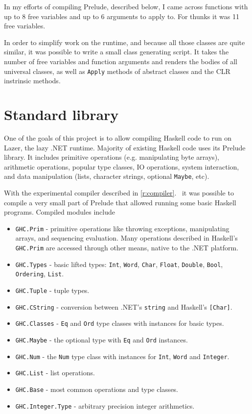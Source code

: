 \documentclass[en]{pracamgr}
\newcommand{\myref}[1]{\ref{#1}.~\textit{\nameref{#1}}}
\begin{document}
In my efforts of compiling Prelude, described below, I came across
functions with up to 8 free variables and up to 6 arguments to apply to.
For thunks it was 11 free variables.

In order to simplify work on the runtime, and because all those classes
are quite similar, it was possible to write a small class generating script.
It takes the number of free variables and function arguments and renders
the bodies of all universal classes, as well as \texttt{Apply} methods
of abstract classes and the CLR instrinsic methods.

\section{Standard library}

One of the goals of this project is to allow compiling
Haskell code to run on Lazer, the lazy .NET runtime.
Majority of existing Haskell code uses its Prelude library.
It includes primitive operations (e.g. manipulating byte arrays),
arithmetic operations, popular type classes,
IO operations, system interaction, and data manipulation
(lists, character strings, optional \texttt{Maybe}, etc).

With the experimental compiler described in \myref{r:compiler}
it was possible to compile a very small part of Prelude that allowed
running some basic Haskell programs. Compiled modules include

\begin{itemize}
    \item \texttt{GHC.Prim} - primitive operations like throwing exceptions,
            manipulating arrays, and sequencing evaluation. Many
            operations described in Haskell's \texttt{GHC.Prim} are accessed
            through other means, native to the .NET platform.
    \item \texttt{GHC.Types} - basic lifted types: \texttt{Int}, \texttt{Word},
            \texttt{Char}, \texttt{Float}, \texttt{Double}, \texttt{Bool},
            \texttt{Ordering}, \texttt{List}.
    \item \texttt{GHC.Tuple} - tuple types.
    \item \texttt{GHC.CString} - conversion between .NET's \texttt{string} and
            Haskell's \texttt{[Char]}.
    \item \texttt{GHC.Classes} - \texttt{Eq} and \texttt{Ord} type classes with
            instances for basic types.
    \item \texttt{GHC.Maybe} - the optional type with \texttt{Eq} and \texttt{Ord} instances.
    \item \texttt{GHC.Num} - the \texttt{Num} type class with instances for \texttt{Int},
            \texttt{Word} and \texttt{Integer}.
    \item \texttt{GHC.List} - list operations.
    \item \texttt{GHC.Base} - most common operations and type classes.
    \item \texttt{GHC.Integer.Type} - arbitrary precision integer arithmetics.
\end{itemize}
\end{document}

